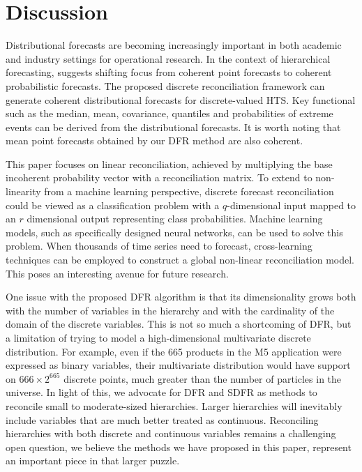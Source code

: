 \documentclass[a4paper,review,11pt,authoryear]{elsarticle}
\theoremstyle{definition}
\begin{document}
     \section{Discussion}
     \label{sec:discussion}



     Distributional forecasts are becoming increasingly important in both academic and industry settings for operational research. In the context of hierarchical forecasting, \cite{kolassaWeWantCoherent2022} suggests shifting focus from coherent point forecasts to coherent probabilistic forecasts.
     The proposed discrete reconciliation framework can generate coherent distributional forecasts for discrete-valued HTS.
     Key functional such as the median, mean, covariance, quantiles and probabilities of extreme events can be derived from the distributional forecasts.
     It is worth noting that mean point forecasts obtained by our DFR method are also coherent.


     This paper focuses on linear reconciliation, achieved by multiplying the base incoherent probability vector with a reconciliation matrix.
     To extend to non-linearity from a machine learning perspective, discrete forecast reconciliation could be viewed as a classification problem with a $q$-dimensional input mapped to an $ r$ dimensional output representing class probabilities. Machine learning models, such as specifically designed neural networks, can be used to solve this problem.
     When thousands of time series need to forecast, cross-learning techniques can be employed to construct a global non-linear reconciliation model. This poses an interesting avenue for future research.

     One issue with the proposed DFR algorithm is that its dimensionality grows both with the number of variables in the hierarchy and with the cardinality of the domain of the discrete variables. This is not so much a shortcoming of DFR, but a limitation of trying to model a high-dimensional multivariate discrete distribution. For example, even if the 665 products in the M5 application were expressed as binary variables, their multivariate distribution would have support on $666\times2^{665}$ discrete points, much greater than the number of particles in the universe. In light of this, we advocate for DFR and SDFR as methods to reconcile small to moderate-sized hierarchies. Larger hierarchies will inevitably include variables that are much better treated as continuous. Reconciling hierarchies with both discrete and continuous variables remains a challenging open question, we believe the methods we have proposed in this paper, represent an important piece in that larger puzzle.
     
\end{document}
